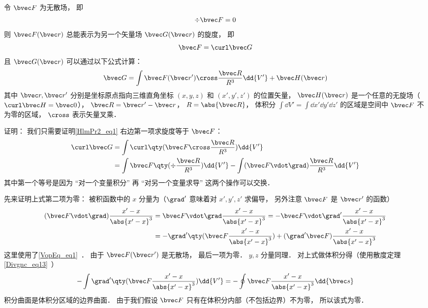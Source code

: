 
\begin{issues}
\issueTODO
\end{issues}


\begin{theorem}{}
令 $\bvec F$ 为无散场， 即
\begin{equation}
\div \bvec F = 0
\end{equation}
则 $\bvec F(\bvec r)$ 总能表示为另一个矢量场 $\bvec G(\bvec r)$ 的旋度， 即
\begin{equation}
\bvec F = \curl \bvec G
\end{equation}
且 $\bvec G(\bvec r)$ 可以通过以下公式计算：
\begin{equation}\label{HlmPr2_eq1}
\bvec G = \int \bvec F(\bvec r') \cross \frac{\bvec R}{R^3} \dd{V'} + \bvec H(\bvec r)
\end{equation}
其中 $\bvec r, \bvec r'$ 分别是坐标原点指向三维直角坐标 $(x, y, z)$ 和 $(x', y', z')$ 的位置矢量， $\bvec H(\bvec r)$ 是一个任意的无旋场（$\curl \bvec H = \bvec 0$）， $\bvec R = \bvec r' - \bvec r$， $R = \abs{\bvec R}$， 体积分 $\int\dd{V'} = \int\dd{x'}\dd{y'}\dd{z'}$ 的区域是空间中 $\bvec F$ 不为零的区域， $\cross$ 表示矢量叉乘．
\end{theorem}

证明： 我们只需要证明\autoref{HlmPr2_eq1} 右边第一项求旋度等于 $\bvec F$：
\begin{equation}\label{HlmPr2_eq3}
\begin{aligned}
\curl \bvec G &= \int \curl \qty(\bvec F \cross \frac{\bvec R}{R^3}) \dd{V'}\\
&= \int\bvec F \qty(\div \frac{\bvec R}{R^3}) \dd{V'} -  \int(\bvec F \vdot \grad) \frac{\bvec R}{R^3} \dd{V'}
\end{aligned}
\end{equation}
其中第一个等号是因为 “对一个变量积分” 再 “对另一个变量求导” 这两个操作可以交换． %

先来证明上式第二项为零： 被积函数中的 $x$ 分量为（$\grad'$ 意味着对 $x', y', z'$ 求偏导， 另外注意 $\bvec F$ 是 $\bvec r'$ 的函数）
\begin{equation}\label{HlmPr2_eq2}
\begin{aligned}
(\bvec F \vdot \grad) \frac{x' - x}{\abs{x'-x}^3} &= \bvec F \vdot \grad \frac{x' - x}{\abs{x'-x}^3} = -\bvec F \vdot \grad' \frac{x' - x}{\abs{x'-x}^3}\\
&= - \grad'\qty(\bvec F \frac{x' - x}{\abs{x'-x}^3}) + (\grad'\bvec F) \frac{x' - x}{\abs{x'-x}^3}
\end{aligned}
\end{equation}
这里使用了\autoref{VopEq_eq1}~． 由于 $\bvec F(\bvec r')$ 是无散场， 最后一项为零． $y, z$ 分量同理． 对上式做体积分得（使用散度定理\autoref{Divgnc_eq13}~）
\begin{equation}
- \int \grad'\qty(\bvec F \frac{x' - x}{\abs{x'-x}^3})\dd{V'} = -\oint \bvec F \frac{x' - x}{\abs{x'-x}^3} \dd{\bvec s}
\end{equation}
积分曲面是体积分区域的边界曲面． 由于我们假设 $\bvec F$ 只有在体积分内部（不包括边界）不为零， 所以该式为零．

